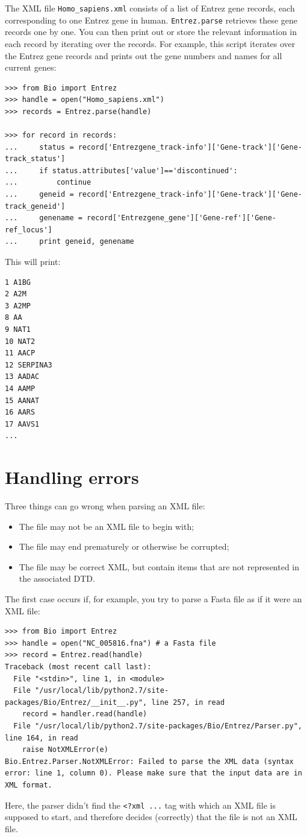 \documentclass{report}
\begin{document}
The XML file \verb+Homo_sapiens.xml+ consists of a list of Entrez gene records, each corresponding to one Entrez gene in human. \verb+Entrez.parse+ retrieves these gene records one by one. You can then print out or store the relevant information in each record by iterating over the records. For example, this script iterates over the Entrez gene records and prints out the gene numbers and names for all current genes:

\begin{verbatim}
>>> from Bio import Entrez
>>> handle = open("Homo_sapiens.xml")
>>> records = Entrez.parse(handle)

>>> for record in records:
...     status = record['Entrezgene_track-info']['Gene-track']['Gene-track_status']
...     if status.attributes['value']=='discontinued':
...         continue
...     geneid = record['Entrezgene_track-info']['Gene-track']['Gene-track_geneid']
...     genename = record['Entrezgene_gene']['Gene-ref']['Gene-ref_locus']
...     print geneid, genename
\end{verbatim}

This will print:
\begin{verbatim}
1 A1BG
2 A2M
3 A2MP
8 AA
9 NAT1
10 NAT2
11 AACP
12 SERPINA3
13 AADAC
14 AAMP
15 AANAT
16 AARS
17 AAVS1
...
\end{verbatim}


\section{Handling errors}

Three things can go wrong when parsing an XML file:
\begin{itemize}
\item The file may not be an XML file to begin with;
\item The file may end prematurely or otherwise be corrupted;
\item The file may be correct XML, but contain items that are not represented in the associated DTD.
\end{itemize}

The first case occurs if, for example, you try to parse a Fasta file as if it were an XML file:
\begin{verbatim}
>>> from Bio import Entrez
>>> handle = open("NC_005816.fna") # a Fasta file
>>> record = Entrez.read(handle)
Traceback (most recent call last):
  File "<stdin>", line 1, in <module>
  File "/usr/local/lib/python2.7/site-packages/Bio/Entrez/__init__.py", line 257, in read
    record = handler.read(handle)
  File "/usr/local/lib/python2.7/site-packages/Bio/Entrez/Parser.py", line 164, in read
    raise NotXMLError(e)
Bio.Entrez.Parser.NotXMLError: Failed to parse the XML data (syntax error: line 1, column 0). Please make sure that the input data are in XML format.
\end{verbatim}
Here, the parser didn't find the \verb|<?xml ...| tag with which an XML file is supposed to start, and therefore decides (correctly) that the file is not an XML file.
\end{document}
